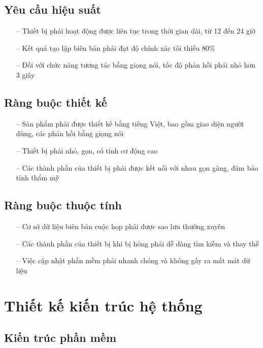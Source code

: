 \subsection{Yêu cầu hiệu suất}
\begin{itemize}
    \item[--] Thiết bị phải hoạt động được liên tục trong thời gian dài, từ 12 đến 24 giờ
    \item[--] Kết quả tạo lập biên bản phải đạt độ chính xác tối thiểu 80\%
    \item[--] Đối với chức năng tương tác bằng giọng nói, tốc độ phản hồi phải nhỏ hơn 3 giây
\end{itemize}

\subsection{Ràng buộc thiết kế}
\begin{itemize}
    \item[--] Sản phẩm phải được thiết kế bằng tiếng Việt, bao gồm giao diện người dùng, các phản hồi bằng giọng nói
    \item[--] Thiết bị phải nhỏ, gọn, có tính cơ động cao
    \item[--] Các thành phần của thiết bị phải được kết nối với nhau gọn gàng, đảm bảo tính thẩm mỹ
\end{itemize}

\subsection{Ràng buộc thuộc tính}
\begin{itemize}
    \item[--] Cơ sở dữ liệu biên bản cuộc họp phải được sao lưu thường xuyên
    \item[--] Các thành phần của thiết bị khi bị hỏng phải dễ dàng tìm kiếm và thay thế
    \item[--] Việc cập nhật phần mềm phải nhanh chóng và không gây ra mất mát dữ liệu
\end{itemize}

\section{Thiết kế kiến trúc hệ thống}

\subsection{Kiến trúc phần mềm}